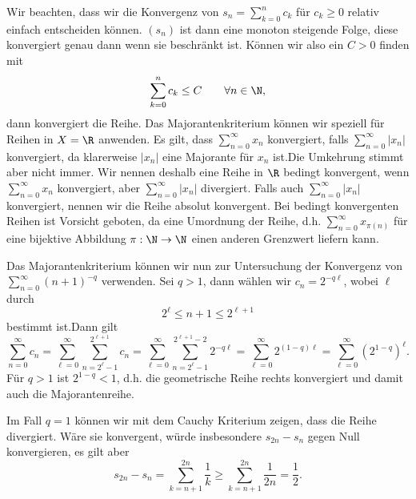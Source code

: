 \documentclass[letterpaper,10pt,english]{jupyterBook}
\begin{document}
Wir beachten, dass wir die Konvergenz von \(s_n=\sum_{k=0}^n c_k\) für \(c_k \geq 0\) relativ einfach entscheiden können. \((s_n)\) ist dann eine monoton steigende Folge, diese konvergiert genau dann wenn sie beschränkt ist. Können wir also ein \(C > 0\) finden mit
\begin{equation*}
 \sum_{k=0}^n c_k \leq C \qquad \forall n \in \N ,
\end{equation*}
dann konvergiert die Reihe.
Das Majorantenkriterium können wir speziell für Reihen in \(X=\R\) anwenden. Es gilt, dass \(\sum_{n=0}^\infty x_n\) konvergiert, falls  \(\sum_{n=0}^\infty |x_n|\)  konvergiert, da klarerweise \(|x_n|\) eine Majorante für \(x_n\) ist.Die Umkehrung stimmt aber nicht immer. Wir nennen deshalb eine Reihe in \(\R\) bedingt konvergent, wenn \(\sum_{n=0}^\infty x_n\) konvergiert, aber \(\sum_{n=0}^\infty |x_n|\)  divergiert. Falls auch \(\sum_{n=0}^\infty |x_n|\) konvergiert, nennen wir die Reihe absolut konvergent. Bei bedingt konvergenten Reihen ist Vorsicht geboten, da eine Umordnung der Reihe, d.h. \(\sum_{n=0}^\infty x_{\pi(n)}\) für eine bijektive Abbildung \(\pi: \N \rightarrow \N\) einen anderen Grenzwert liefern kann.
\label{metrik/reihen:example-6}
\begin{example}{}{}



Das Majorantenkriterium können wir nun zur Untersuchung der Konvergenz von \(\sum_{n=0}^\infty (n+1)^{-q}\) verwenden.
Sei \(q > 1\), dann wählen wir \(c_n = 2^{-q \ell}\), wobei \(\ell\) durch
\begin{equation*}
 2^\ell \leq n+1 \leq 2^{\ell+1}
\end{equation*}
bestimmt ist.Dann gilt
\begin{equation*}
 \sum_{n=0}^\infty c_n = \sum_{\ell=0}^\infty \sum_{n=2^\ell-1}^{2^{\ell+1}} c_n = \sum_{\ell=0}^\infty \sum_{n=2^\ell-1}^{2^{\ell+1}-2} 2^{-q\ell} =  \sum_{\ell=0}^\infty  2^{(1-q)\ell} = \sum_{\ell=0}^\infty  (2^{1-q})^\ell.
\end{equation*}
Für \(q > 1\) ist \(2^{1-q} < 1\), d.h. die geometrische Reihe rechts konvergiert und damit auch die Majorantenreihe.

Im Fall \(q=1\) können wir mit dem Cauchy Kriterium zeigen, dass die Reihe divergiert. Wäre sie konvergent, würde insbesondere \(s_{2n} -s_n\) gegen Null konvergieren, es gilt aber
\begin{equation*}
 s_{2n} -s_n = \sum_{k=n+1}^{2n} \frac{1}k \geq \sum_{k=n+1}^{2n} \frac{1}{2n} = \frac{1}2.
\end{equation*}\end{example}
\end{document}
